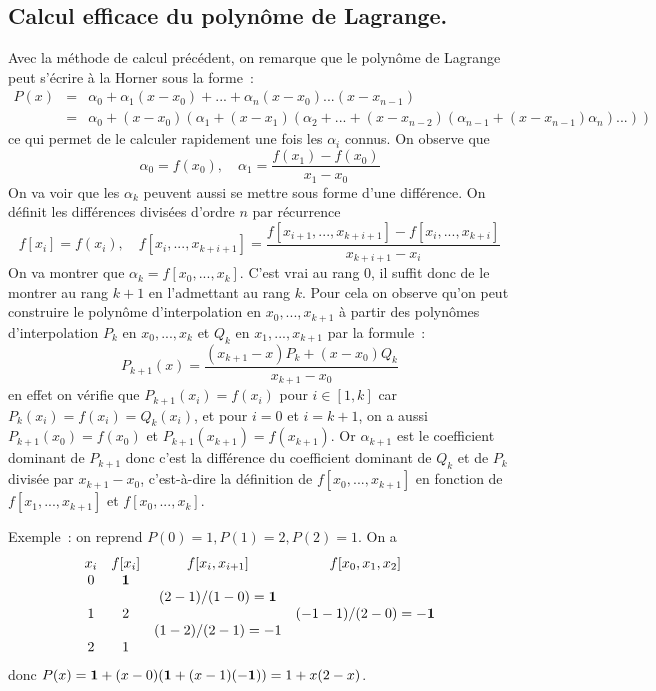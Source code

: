 \documentclass[a4paper,11pt]{book}
\begin{document}
\begin{giacjshere}
\subsection{Calcul efficace du polyn\^ome de
  Lagrange.}
Avec la m\'ethode de calcul pr\'ec\'edent, on remarque que le
polyn\^ome de Lagrange peut s'\'ecrire \`a la Horner sous la forme~:
\begin{eqnarray*}
 P(x) &=& \alpha_0 + \alpha_1 (x-x_0) + ... + \alpha_n
 (x-x_0)...(x-x_{n-1}) \\
&=& \alpha_0 + (x-x_0)( \alpha_1 + (x-x_1)(\alpha_2 +  ... +
(x-x_{n-2})(\alpha_{n-1}+(x-x_{n-1}) \alpha_n)...))
\end{eqnarray*}
ce qui permet de le calculer rapidement une fois les $\alpha_i$
connus.
On observe que 
\[ \alpha_0=f(x_0), \quad \alpha_1=\frac{f(x_1)-f(x_0)}{x_1-x_0} \]
On va voir que les $\alpha_k$ peuvent aussi se mettre sous forme
d'une diff\'erence.
On d\'efinit les diff\'erences divis\'ees d'ordre $n$ par r\'ecurrence
\[ f[x_i]=f(x_i), \quad f[x_i,...,x_{k+i+1}]=
\frac{f[x_{i+1},...,x_{k+i+1}]-f[x_i,...,x_{k+i}]}{x_{k+i+1}-x_i} \]
On va montrer que $\alpha_k=f[x_0,...,x_k]$.
C'est vrai au rang 0, il suffit donc de le montrer au rang $k+1$ en
l'admettant au rang $k$. Pour cela on observe qu'on peut construire 
le polyn\^ome d'interpolation en $x_0,...,x_{k+1}$ \`a partir des polyn\^omes 
d'interpolation $P_k$ en $x_0,...,x_k$ et $Q_k$ en $x_1,...,x_{k+1}$ 
par la formule~:
\[ P_{k+1}(x)= \frac{(x_{k+1}-x)P_k + (x-x_0)Q_k}{x_{k+1}-x_0}\]
en effet on v\'erifie que $P_{k+1}(x_i)=f(x_i)$ pour $i\in [1,k]$ car
$P_k(x_i)=f(x_i)=Q_k(x_i)$,
et pour $i=0$ et $i=k+1$, on a aussi $P_{k+1}(x_0)=f(x_0)$ et  
$P_{k+1}(x_{k+1})=f(x_{k+1})$.
Or $\alpha_{k+1}$ est le coefficient dominant de $P_{k+1}$ donc
c'est la diff\'erence du coefficient dominant de $Q_k$ et de $P_k$
divis\'ee par $x_{k+1}-x_0$, c'est-\`a-dire la d\'efinition de 
$f[x_0,...,x_{k+1}]$ en fonction de $f[x_1,...,x_{k+1}]$ et $f[x_0,...,x_{k}]$.

Exemple~: on reprend $P(0)=1, P(1)=2, P(2)=1$. On a
\[
\begin{array}{cccc}
x_i & f[x_i] & f[x_i,x_{i+1}] & f[x_0,x_1,x_2] \\
0 & {\bf 1} & & \\
  &   & (2-1)/(1-0)={\bf 1} & \\
1 & 2 & &  (-1-1)/(2-0)={\bf -1}   \\
  &   & (1-2)/(2-1)=-1 & \\
2 & 1 & & \\
\end{array}
\]
donc $P(x)={\bf 1}+(x-0)({\bf 1}+(x-1)({\bf -1}))=1+x(2-x)$.


\end{giacjshere}
\end{document}

